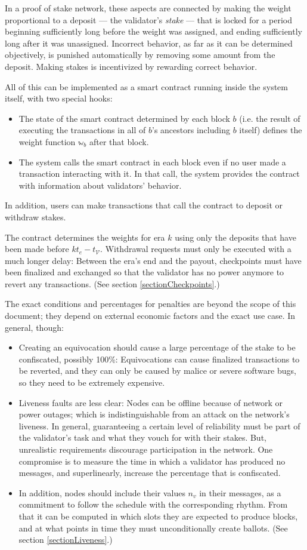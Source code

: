 \documentclass[12pt, fleqn]{article}
\newcommand{\ww}{\mathbb{w}}
\begin{document}
In a proof of stake network, these aspects are connected by making the weight proportional to a deposit --- the validator's \emph{stake} --- that is locked for a period beginning sufficiently long before the weight was assigned, and ending sufficiently long after it was unassigned. Incorrect behavior, as far as it can be determined objectively, is punished automatically by removing some amount from the deposit. Making stakes is incentivized by rewarding correct behavior.

All of this can be implemented as a smart contract running inside the system itself, with two special hooks:
\begin{itemize}
  \item The state of the smart contract determined by each block $b$ (i.e. the result of executing the transactions in all of $b$'s ancestors including $b$ itself) defines the weight function $\ww_b$ after that block.
  \item The system calls the smart contract in each block even if no user made a transaction interacting with it. In that call, the system provides the contract with information about validators' behavior.
\end{itemize}
In addition, users can make transactions that call the contract to deposit or withdraw stakes.

The contract determines the weights for era $k$ using only the deposits that have been made before $k t_e - t_{\mathcal{V}}$. Withdrawal requests must only be executed with a much longer delay: Between the era's end and the payout, checkpoints must have been finalized and exchanged so that the validator has no power anymore to revert any transactions. (See section \ref{sectionCheckpoints}.)

The exact conditions and percentages for penalties are beyond the scope of this document; they depend on external economic factors and the exact use case. In general, though:
\begin{itemize}
  \item Creating an equivocation should cause a large percentage of the stake to be confiscated, possibly 100\%: Equivocations can cause finalized transactions to be reverted, and they can only be caused by malice or severe software bugs, so they need to be extremely expensive.
  \item Liveness faults are less clear: Nodes can be offline because of network or power outages; which is indistinguishable from an attack on the network's liveness. In general, guaranteeing a certain level of reliability must be part of the validator's task and what they vouch for with their stakes. But, unrealistic requirements discourage participation in the network. One compromise is to measure the time in which a validator has produced no messages, and superlinearly, increase the percentage that is confiscated.
  \item In addition, nodes should include their values $n_v$ in their messages, as a commitment to follow the schedule with the corresponding rhythm. From that it can be computed in which slots they are expected to produce blocks, and at what points in time they must unconditionally create ballots. (See section \ref{sectionLiveness}.)
\end{itemize}
\end{document}

